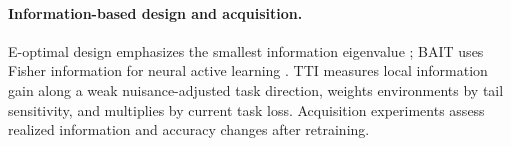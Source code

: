 \paragraph{Information-based design and acquisition.}
E-optimal design emphasizes the smallest information eigenvalue \citep{pukelsheim2006optimal}; BAIT uses Fisher information for neural active learning \citep{ash2021gone}. TTI measures local information gain along a weak nuisance-adjusted task direction, weights environments by tail sensitivity, and multiplies by current task loss. Acquisition experiments assess realized information and accuracy changes after retraining.
